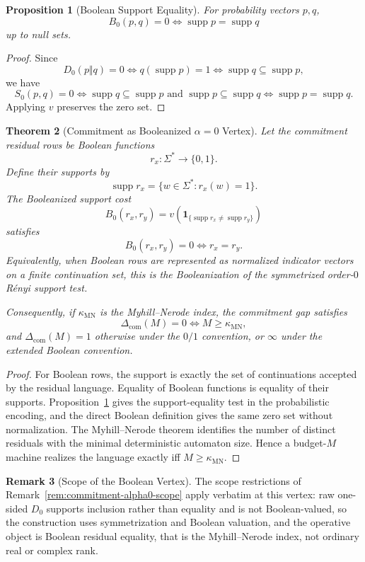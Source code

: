 \documentclass[12pt]{article}
\newtheorem{theorem}{Theorem}[section]
\newtheorem{proposition}[theorem]{Proposition}
\theoremstyle{definition}
\newtheorem{remark}[theorem]{Remark}
\DeclareMathOperator{\supp}{supp}
\newcommand{\Com}{\Delta_{\mathrm{com}}}
\newcommand{\kappaMN}{\kappa_{\mathrm{MN}}}
\newcommand{\Ren}[1]{D_{#1}}
\begin{document}
\begin{proposition}[Boolean Support Equality]
\label{prop:B0}
For probability vectors $p,q$,
\[
B_0(p,q)=0
\iff
\supp p=\supp q
\]
up to null sets.
\end{proposition}

\begin{proof}
Since
\[
\Ren{0}(p\Vert q)=0
\iff
q(\supp p)=1
\iff
\supp q\subseteq\supp p,
\]
we have
\[
S_0(p,q)=0
\iff
\supp q\subseteq\supp p
\text{ and }
\supp p\subseteq\supp q
\iff
\supp p=\supp q.
\]
Applying $v$ preserves the zero set.
\end{proof}

\begin{theorem}[Commitment as Booleanized $\alpha=0$ Vertex]
\label{thm:commitment-alpha0}
Let the commitment residual rows be Boolean functions
\[
r_x:\Sigma^*\to\{0,1\}.
\]
Define their supports by
\[
\supp r_x=\{w\in\Sigma^*:r_x(w)=1\}.
\]
The Booleanized support cost
\[
B_0(r_x,r_y)
=
v(\mathbf 1_{\{\supp r_x\neq\supp r_y\}})
\]
satisfies
\[
B_0(r_x,r_y)=0
\iff
r_x=r_y.
\]
Equivalently, when Boolean rows are represented as normalized indicator
vectors on a finite continuation set, this is the Booleanization of the
symmetrized order-$0$ R\'enyi support test.

Consequently, if $\kappaMN$ is the Myhill--Nerode index, the commitment gap
satisfies
\[
\Com(M)=0
\iff
M\ge\kappaMN,
\]
and $\Com(M)=1$ otherwise under the $0/1$ convention, or $\infty$ under the
extended Boolean convention.
\end{theorem}

\begin{proof}
For Boolean rows, the support is exactly the set of continuations accepted by
the residual language.  Equality of Boolean functions is equality of their
supports.  Proposition~\ref{prop:B0} gives the support-equality test in the
probabilistic encoding, and the direct Boolean definition gives the same zero
set without normalization.  The Myhill--Nerode theorem identifies the number of
distinct residuals with the minimal deterministic automaton size.  Hence a
budget-$M$ machine realizes the language exactly iff $M\ge\kappaMN$.
\end{proof}

\begin{remark}[Scope of the Boolean Vertex]
\label{rem:exponent-alpha0-scope}
The scope restrictions of Remark~\ref{rem:commitment-alpha0-scope} apply
verbatim at this vertex: raw one-sided $D_0$ supports inclusion rather than
equality and is not Boolean-valued, so the construction uses symmetrization and
Boolean valuation, and the operative object is Boolean residual equality, that
is the Myhill--Nerode index, not ordinary real or complex rank.
\end{remark}
\end{document}
